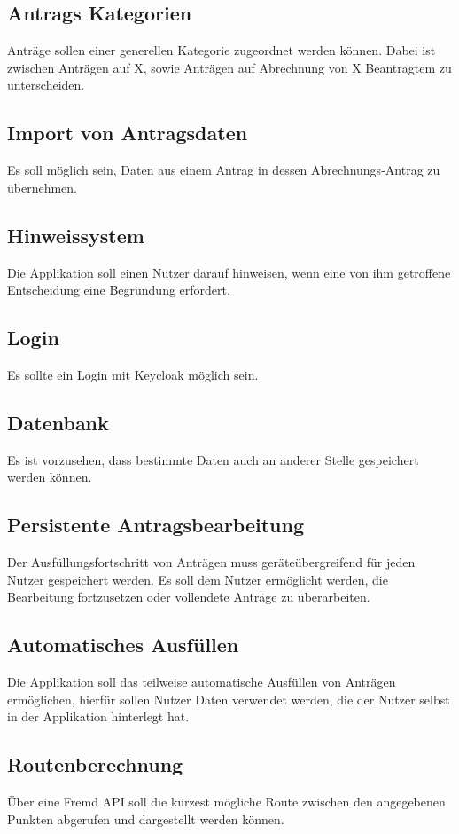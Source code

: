 \subsection{Antrags Kategorien}\label{subsec:antrags-kategorien}
Anträge sollen einer generellen Kategorie zugeordnet werden können.
Dabei ist zwischen Anträgen auf X, sowie Anträgen auf Abrechnung von X Beantragtem zu unterscheiden.
\subsection{Import von Antragsdaten}\label{subsec:import-von-antragsdaten}
Es soll möglich sein, Daten aus einem Antrag in dessen Abrechnungs-Antrag zu übernehmen.
\subsection{Hinweissystem}\label{subsec:hinweis-system}
Die Applikation soll einen Nutzer darauf hinweisen, wenn eine von ihm getroffene Entscheidung eine Begründung erfordert.
\subsection{Login}\label{subsec:login}
Es sollte ein Login mit Keycloak möglich sein.
\subsection{Datenbank}\label{subsec:datenbank}
Es ist vorzusehen, dass bestimmte Daten auch an anderer Stelle gespeichert werden können.
\subsection{Persistente Antragsbearbeitung}\label{subsec:persistente-antragsbearbeitung}
Der Ausfüllungsfortschritt von Anträgen muss geräteübergreifend für jeden Nutzer gespeichert werden.
Es soll dem Nutzer ermöglicht werden, die Bearbeitung fortzusetzen oder vollendete Anträge zu überarbeiten.
\subsection{Automatisches Ausfüllen}\label{subsec:automatisches-ausfullen}
Die Applikation soll das teilweise automatische Ausfüllen von Anträgen ermöglichen, hierfür sollen Nutzer Daten verwendet werden,
die der Nutzer selbst in der Applikation hinterlegt hat.
\subsection{Routenberechnung}\label{subsec:routenberechnung}
Über eine Fremd \ac{API} soll die kürzest mögliche Route zwischen den angegebenen Punkten abgerufen und dargestellt werden können.
